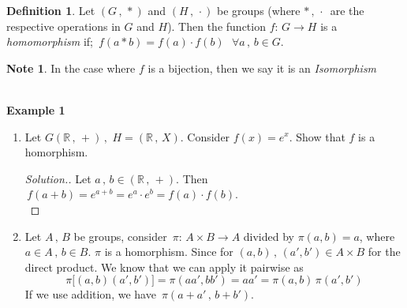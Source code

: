 \documentclass[11pt,a4paper]{article}
\theoremstyle{definition}
\newtheorem{defn}[thm]{Definition}
\newtheorem*{note}{Note}
\newenvironment{solution}
  {\renewcommand{\qedsymbol}{}\begin{proof}[\textit{Solution}.]}
  {\end{proof}}
\begin{document}
\begin{defn}
Let $(G\, , \, *)$ and $(H\, , \,\cdot)$ be groups (where $*\, ,\, \cdot\,$ are the respective operations in $G$ and $H$). Then the function $f:\, G\longrightarrow H$ is a \textit{homomorphism} if; $\, f(a*b) = f(a)\cdot f(b)\,\,\,\, \forall a\, , \, b\in G$.


\begin{figure}[H]
\centering
{}
\end{figure}














\begin{note}
In the case where $f$ is a bijection, then we say it is an \textit{Isomorphism}\\\\
\end{note}
\end{defn}




\textbf{Example 1}
\begin{enumerate}
\item Let $G(\mathbb{R}\, ,\, +)\, , \,\, H = (\mathbb{R}\, ,\, X)$. Consider $f(x) = e^x$.  Show that $f$ is a homorphism.\\

\begin{solution}
Let $a\, , \, b\in (\mathbb{R}\, , \, +)$. Then $\, f(a + b) = e^{a+b} = e^a\cdot e^b = f(a)\cdot f(b)$.\\
\end{solution}


\item Let $A\, , \, B$ be groups, consider $\, \pi :\, A\times B \longrightarrow A$ divided by $\pi (a,b) = a$, where $a\in A\, , \, b\in B$. $\pi$ is a homorphism. Since for $(a,b)\, ,\, (a',b')\in A\times B$ for the direct product. We know that we can apply it pairwise as 
$$\pi\big[(a,b)(a',b')\big] = \pi(aa',bb') = aa' = \pi (a,b)\, \pi(a',b')$$
If we use addition, we have $\, \pi(a+a'\, , \, b+ b')$.\\\\
\end{enumerate}
\end{document}
